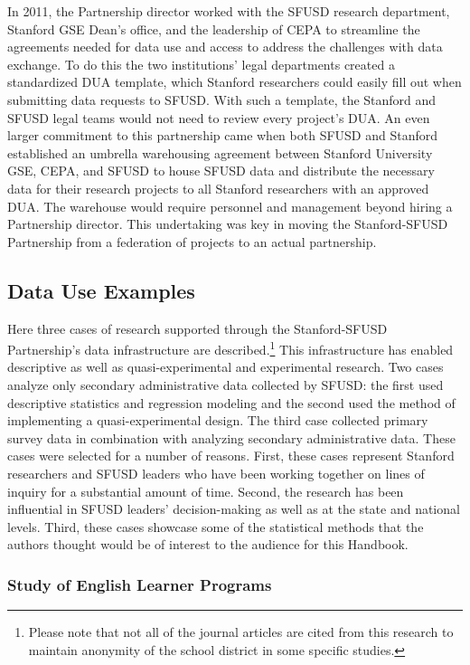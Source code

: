 In 2011, the Partnership director worked with the SFUSD research department, Stanford GSE Dean's office, and the leadership of CEPA to streamline the agreements needed for data use and access to address the challenges with data exchange. To do this the two institutions' legal departments created a standardized DUA template, which Stanford researchers could easily fill out when submitting data requests to SFUSD. With such a template, the Stanford and SFUSD legal teams would not need to review every project's DUA. An even larger commitment to this partnership came when both SFUSD and Stanford established an umbrella warehousing agreement between Stanford University GSE, CEPA, and SFUSD to house SFUSD data and distribute the necessary data for their research projects to all Stanford researchers with an approved DUA. The warehouse would require personnel and management beyond hiring a Partnership director. This undertaking was key in moving the Stanford-SFUSD Partnership from a federation of projects to an actual partnership.

\hypertarget{data-use-examples-4}{%
\subsection{Data Use Examples}\label{data-use-examples-4}}

Here three cases of research supported through the Stanford-SFUSD Partnership's data infrastructure are described.\footnote{Please note that not all of the journal articles are cited from this research to maintain anonymity of the school district in some specific studies.} This infrastructure has enabled descriptive as well as quasi-experimental and experimental research. Two cases analyze only secondary administrative data collected by SFUSD: the first used descriptive statistics and regression modeling and the second used the method of implementing a quasi-experimental design. The third case collected primary survey data in combination with analyzing secondary administrative data. These cases were selected for a number of reasons. First, these cases represent Stanford researchers and SFUSD leaders who have been working together on lines of inquiry for a substantial amount of time. Second, the research has been influential in SFUSD leaders' decision-making as well as at the state and national levels. Third, these cases showcase some of the statistical methods that the authors thought would be of interest to the audience for this Handbook.

\hypertarget{study-of-english-learner-programs}{%
\subsubsection*{Study of English Learner Programs}\label{study-of-english-learner-programs}}

